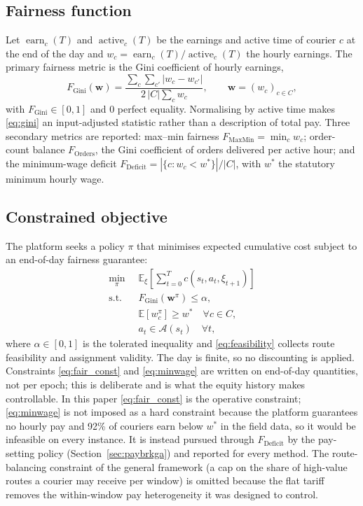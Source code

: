 \documentclass[preprint,12pt,authoryear]{elsarticle}%
\newcommand{\FG}{F_{\text{Gini}}}
\newcommand{\FD}{F_{\text{Deficit}}}
\newcommand{\FO}{F_{\text{Orders}}}
\newcommand{\FM}{F_{\text{MaxMin}}}
\newcommand{\E}{\mathbb{E}}
\DeclareMathOperator{\earn}{earn}
\DeclareMathOperator{\act}{active}
\begin{document}
\subsection{Fairness function}

Let $\earn_c(T)$ and $\act_c(T)$ be the earnings and active time of courier $c$ at the end of the day and $w_c = \earn_c(T)/\act_c(T)$ the hourly earnings. The primary fairness metric is the Gini coefficient of hourly earnings,
\begin{equation}
\FG(\mathbf{w}) = \frac{\sum_{c} \sum_{c'} |w_c - w_{c'}|}{2\,|C| \sum_{c} w_c},
\qquad \mathbf{w} = (w_c)_{c \in C},
\label{eq:gini}
\end{equation}
with $\FG \in [0,1]$ and $0$ perfect equality. Normalising by active time makes \eqref{eq:gini} an input-adjusted statistic rather than a description of total pay. Three secondary metrics are reported: max--min fairness $\FM = \min_c w_c$; order-count balance $\FO$, the Gini coefficient of orders delivered per active hour; and the minimum-wage deficit $\FD = |\{c : w_c < w^*\}| / |C|$, with $w^*$ the statutory minimum hourly wage.

\subsection{Constrained objective}

The platform seeks a policy $\pi$ that minimises expected cumulative cost subject to an end-of-day fairness guarantee:
\begin{align}
\min_{\pi}\;\; & \E_{\xi}\!\left[\sum_{t=0}^{T} c(s_t, a_t, \xi_{t+1})\right] \label{eq:obj}\\
\text{s.t.}\;\; & \FG(\mathbf{w}^{\pi}) \le \alpha, \label{eq:fair_const}\\
& \E[w_c^{\pi}] \ge w^* \quad \forall c \in C, \label{eq:minwage}\\
& a_t \in \mathcal{A}(s_t) \quad \forall t, \label{eq:feasibility}
\end{align}
where $\alpha \in [0,1]$ is the tolerated inequality and \eqref{eq:feasibility} collects route feasibility and assignment validity. The day is finite, so no discounting is applied. Constraints \eqref{eq:fair_const} and \eqref{eq:minwage} are written on end-of-day quantities, not per epoch; this is deliberate and is what the equity history makes controllable. In this paper \eqref{eq:fair_const} is the operative constraint; \eqref{eq:minwage} is not imposed as a hard constraint because the platform guarantees no hourly pay and 92\% of couriers earn below $w^*$ in the field data, so it would be infeasible on every instance. It is instead pursued through $\FD$ by the pay-setting policy (Section~\ref{sec:paybrkga}) and reported for every method. The route-balancing constraint of the general framework (a cap on the share of high-value routes a courier may receive per window) is omitted because the flat tariff removes the within-window pay heterogeneity it was designed to control.
\end{document}

